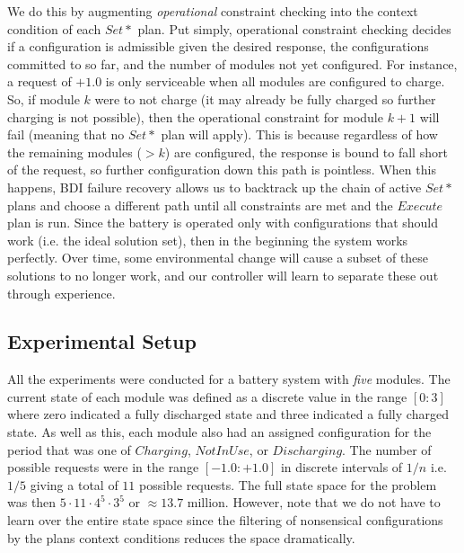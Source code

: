 We do this by augmenting {\em operational} constraint checking into the context condition of each $Set*$ plan. Put simply, operational constraint checking decides if a configuration is admissible given the desired response, the configurations committed to so far, and the number of modules not yet configured. For instance, a request of $+1.0$ is only serviceable when all modules are configured to charge. So, if module $k$ were to not charge (it may already be fully charged so further charging is not possible), then the operational constraint for module $k+1$ will fail (meaning that no $Set*$ plan will apply). This is because regardless of how the remaining modules ($>k$) are configured, the response is bound to fall short of the request, so further configuration down this path is pointless. When this happens, BDI failure recovery allows us to backtrack up the chain of active $Set*$ plans and choose a different path until all constraints are met and the $Execute$ plan is run. Since the battery is operated only with configurations that should work (i.e. the ideal solution set), then in the beginning the system works perfectly. Over time, some environmental change will cause a subset of these solutions to no longer work, and our controller will learn to separate these out through experience.




\subsection{Experimental Setup}\label{subsec:setup}

All the experiments were conducted for a battery system with {\em five} modules. The current state of each module was defined as a discrete value in the range $[0:3]$ where zero indicated a fully discharged state and three indicated a fully charged state. As well as this, each module also had an assigned configuration for the period that was one of $Charging$, $NotInUse$, or $Discharging$. The number of possible requests were in the range $[-1.0:+1.0]$ in discrete intervals of $1/n$ i.e. $1/5$ giving a total of $11$ possible requests. The full state space for the problem was then $5 \cdot 11 \cdot 4^5 \cdot 3^5$ or $\approx 13.7$ million. However, note that we do not have to learn over the entire state space since the filtering of nonsensical configurations by the plans context conditions reduces the space dramatically.

